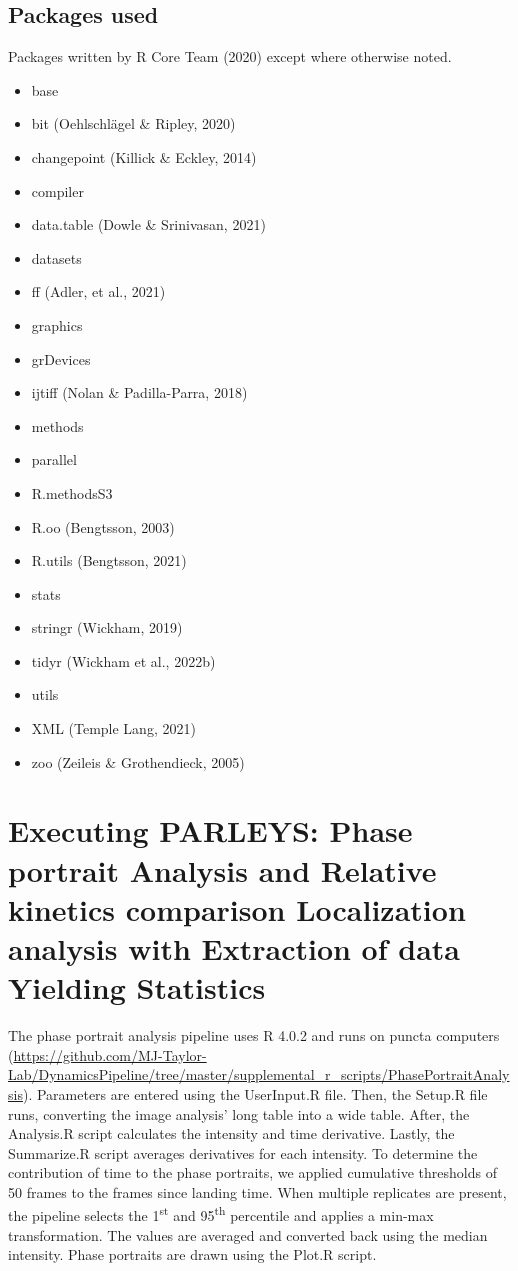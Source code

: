 \subsection{Packages used}
Packages written by R Core Team (2020) except where otherwise noted.
\begin{itemize}
\item base
\item bit (Oehlschlägel \& Ripley, 2020)
\item changepoint (Killick \& Eckley, 2014)
\item compiler
\item data.table (Dowle \& Srinivasan, 2021)
\item datasets
\item ff (Adler, et al., 2021)
\item graphics
\item grDevices
\item ijtiff (Nolan \& Padilla-Parra, 2018)
\item methods
\item parallel
\item R.methodsS3
\item R.oo (Bengtsson, 2003)
\item R.utils (Bengtsson, 2021)
\item stats
\item stringr (Wickham, 2019)
\item tidyr (Wickham et al., 2022b)
\item utils
\item XML (Temple Lang, 2021)
\item zoo (Zeileis \& Grothendieck, 2005)
\end{itemize}

\section{Executing PARLEYS: Phase portrait Analysis and Relative kinetics comparison Localization analysis with Extraction of data Yielding Statistics}
\label{section:PARLEYS}
The phase portrait analysis pipeline uses R 4.0.2 and runs on puncta computers (\url{https://github.com/MJ-Taylor-Lab/DynamicsPipeline/tree/master/supplemental\_r\_scripts/PhasePortraitAnalysis}). Parameters are entered using the UserInput.R file. Then, the Setup.R file runs, converting the image analysis’ long table into a wide table. After, the Analysis.R script calculates the intensity and time derivative. Lastly, the Summarize.R script averages derivatives for each intensity. To determine the contribution of time to the phase portraits, we applied cumulative thresholds of 50 frames to the frames since landing time. When multiple replicates are present, the pipeline selects the 1\textsuperscript{st} and 95\textsuperscript{th} percentile and applies a min-max transformation. The values are averaged and converted back using the median intensity. Phase portraits are drawn using the Plot.R script.


